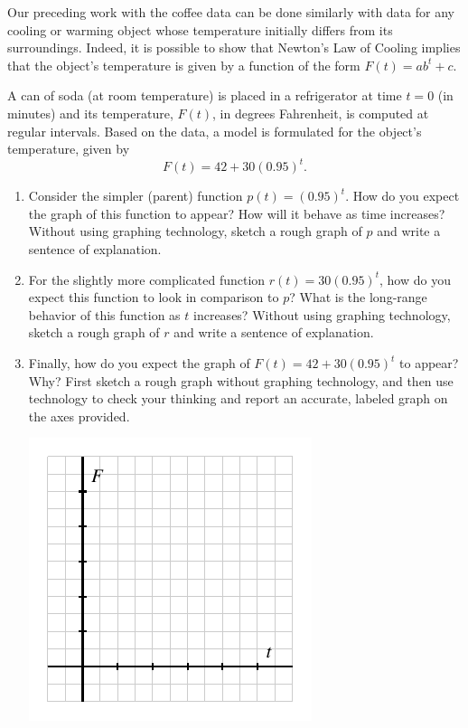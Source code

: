 \documentclass[nooutcomes]{ximera}
\begin{document}
Our preceding work with the coffee data can be done similarly with data for any cooling or warming object whose temperature initially differs from its surroundings.  Indeed, it is possible to show that Newton's Law of Cooling implies that the object's temperature is given by a function of the form $F(t) = ab^t + c$.

\begin{exploration}
A can of soda (at room temperature) is placed in a refrigerator at time $t = 0$ (in minutes) and its temperature, $F(t)$, in degrees Fahrenheit, is computed at regular intervals. Based on the data, a model is formulated for the object's temperature, given by
\begin{equation*}
F(t) = 42 + 30(0.95)^{t}\text{.}
\end{equation*}
\begin{enumerate}[label=\alph*.]
\item Consider the simpler (parent) function $p(t) = (0.95)^t$. How do you expect the graph of this function to appear? How will it behave as time increases? Without using graphing technology, sketch a rough graph of $p$ and write a sentence of explanation.
\item For the slightly more complicated function $r(t) = 30 (0.95)^{t}$, how do you expect this function to look in comparison to $p$?  What is the long-range behavior of this function as $t$ increases? Without using graphing technology, sketch a rough graph of $r$ and write a sentence of explanation.
\item Finally, how do you expect the graph of $F(t) = 42 + 30(0.95)^{t}$ to appear? Why?  First sketch a rough graph without graphing technology, and then use technology to check your thinking and report an accurate, labeled graph on the axes provided.
\begin{image}
\includegraphics{modeling-F-t-blank-axes.pdf}

\end{image}
\end{enumerate}
\end{exploration}
\end{document}
